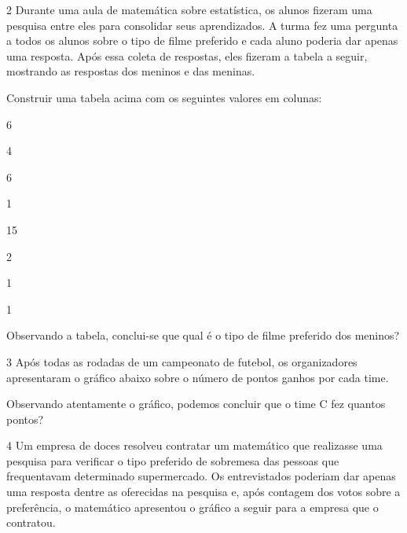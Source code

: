 {\num{2} Durante uma aula de matemática sobre estatística, os alunos fizeram
uma pesquisa entre eles para consolidar seus aprendizados. A turma fez
uma pergunta a todos os alunos sobre o tipo de filme preferido e cada
aluno poderia dar apenas uma resposta. Após essa coleta de respostas,
eles fizeram a tabela a seguir, mostrando as respostas dos meninos e das meninas.


Construir uma tabela acima com os seguintes valores em colunas:

\begin{multicols}{2}
6

4

6

1

\columnbreak

 15

 2

 1

 1
\end{multicols} 

Observando a tabela, conclui-se que qual é o tipo de filme preferido dos meninos?



\num{3} Após todas as rodadas de um campeonato de futebol, os organizadores
apresentaram o gráfico abaixo sobre o número de pontos ganhos por cada time.


Observando atentamente o gráfico, podemos concluir que o time C fez quantos pontos?



\num{4} Um empresa de doces resolveu contratar um matemático que realizasse
uma pesquisa para verificar o tipo preferido de sobremesa das pessoas
que frequentavam determinado supermercado. Os entrevistados poderiam dar
apenas uma resposta dentre as oferecidas na pesquisa e, após contagem dos
votos sobre a preferência, o matemático apresentou o gráfico a seguir
para a empresa que o contratou.


}
